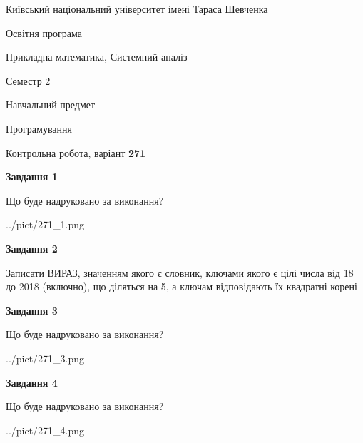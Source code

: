 \documentclass[12pt, ukrainian]{article}
\begin{document}
{{\begin {small}\par
{ \center  Київський національний університет імені Тараса Шевченка \par}
{\parbox {5 cm}{Освітня програма \hfill}{\parbox {8 cm}{Прикладна математика, Системний аналіз \hfill}}\parbox {5 cm}{\hfill Семестр 2}}\par
{\parbox {5 cm} {Навчальний предмет \hfill}\parbox {7 cm}{Програмування \hfill}\parbox {6cm}{\hfill}\par}\vspace{-7pt} \end{small}}{\center Контрольна робота, варіант  \No \textbf
{ 271 }\par}}
{
\begin {large}
{\begin {center}\textbf{Завдання 1}\end {center}}\par
Що буде надруковано за виконання?\par\par
\begin{center}
	{../pict/271_1.png}
\end{center}
\newpage

{\begin {center}\textbf{Завдання 2}\end {center}}\par
Записати ВИРАЗ, значенням якого є словник, ключами якого є цілі числа від 18 до 2018 (включно), що діляться на 5, а ключам відповідають їх квадратні корені\par
\newpage

{\begin {center}\textbf{Завдання 3}\end {center}}\par
Що буде надруковано за виконання?
\begin{center}
	{../pict/271_3.png}
\end{center}
\newpage

{\begin {center}\textbf{Завдання 4}\end {center}}\par
Що буде надруковано за виконання?\par
\begin{center}
	{../pict/271_4.png}
\end{center}
\newpage


\end{large}}
\end{document}
